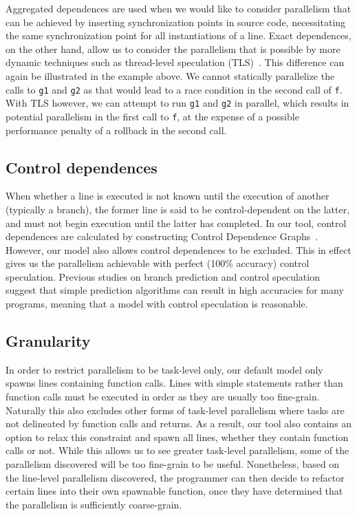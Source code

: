 Aggregated dependences are used when we would like to consider parallelism that can be achieved by inserting synchronization points in source code, necessitating the same synchronization point for all instantiations of a line.
Exact dependences, on the other hand, allow us to consider the parallelism that is possible by more dynamic techniques such as thread-level speculation (TLS)~\cite{Rundberg01anall-software,gregory05stampede, welc05safe}.
This difference can again be illustrated in the example above.
We cannot statically parallelize the calls to \texttt{g1} and \texttt{g2} as that would lead to a race condition in the second call of \texttt{f}.
With TLS however, we can attempt to run \texttt{g1} and \texttt{g2} in parallel, which results in potential parallelism in the first call to \texttt{f}, at the expense of a possible performance penalty of a rollback in the second call.

\subsection{Control dependences}
When whether a line is executed is not known until the execution of another (typically a branch), the former line is said to be control-dependent on the latter, and must not begin execution until the latter has completed.
In our tool, control dependences are calculated by constructing Control Dependence Graphs~\cite{ferrante87program}.
However, our model also allows control dependences to be excluded.
This in effect gives us the parallelism achievable with perfect (100\% accuracy) control speculation.
Previous studies on branch prediction and control speculation~\cite{smith98study,lam92limits} suggest that simple prediction algorithms can result in high accuracies for many programs, meaning that a model with control speculation is reasonable.

\subsection{Granularity}
In order to restrict parallelism to be task-level only, our default model only spawns lines containing function calls.
Lines with simple statements rather than function calls must be executed in order as they are usually too fine-grain.
Naturally this also excludes other forms of task-level parallelism where tasks are not delineated by function calls and returns.
As a result, our tool also contains an option to relax this constraint and spawn all lines, whether they contain function calls or not.
While this allows us to see greater task-level parallelism, some of the parallelism discovered will be too fine-grain to be useful.
Nonetheless, based on the line-level parallelism discovered, the programmer can then decide to refactor certain lines into their own spawnable function, once they have determined that the parallelism is sufficiently coarse-grain.

